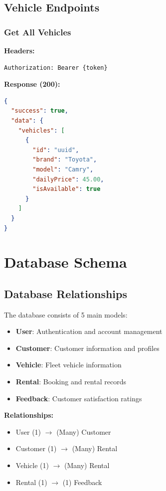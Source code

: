 \documentclass[12pt,a4paper]{article}
\begin{document}
\subsection{Vehicle Endpoints}

\subsubsection{Get All Vehicles}

\begin{tcolorbox}[colback=blue!5!white,colframe=blue!75!black,title=GET /api/vehicles]
\textbf{Headers:}
\begin{lstlisting}
Authorization: Bearer {token}
\end{lstlisting}

\textbf{Response (200):}
\begin{lstlisting}[language=json]
{
  "success": true,
  "data": {
    "vehicles": [
      {
        "id": "uuid",
        "brand": "Toyota",
        "model": "Camry",
        "dailyPrice": 45.00,
        "isAvailable": true
      }
    ]
  }
}
\end{lstlisting}
\end{tcolorbox}

\section{Database Schema}

\subsection{Database Relationships}

The database consists of 5 main models:

\begin{itemize}
    \item \textbf{User}: Authentication and account management
    \item \textbf{Customer}: Customer information and profiles
    \item \textbf{Vehicle}: Fleet vehicle information
    \item \textbf{Rental}: Booking and rental records
    \item \textbf{Feedback}: Customer satisfaction ratings
\end{itemize}

\textbf{Relationships:}
\begin{itemize}
    \item User (1) $\rightarrow$ (Many) Customer
    \item Customer (1) $\rightarrow$ (Many) Rental
    \item Vehicle (1) $\rightarrow$ (Many) Rental
    \item Rental (1) $\rightarrow$ (1) Feedback
\end{itemize}
\end{document}
